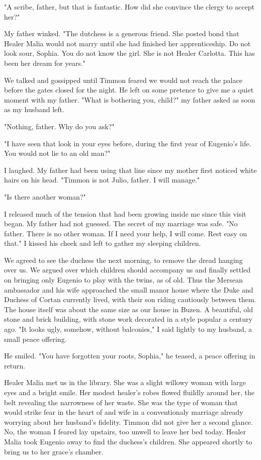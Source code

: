\documentclass{article}
\begin{document}
"A scribe, father, but that is fantastic. How did she convince the clergy to accept her?"

My father winked. "The dutchess is a generous friend. She posted bond that Healer Malia would not marry until she had finished her apprenticeship. Do not look sour, Sophia. You do not know the girl. She is not Healer Carlotta. This has been her dream for years."

We talked and gossipped until Timmon feared we would not reach the palace before the gates closed for the night. He left on some pretence to give me a quiet moment with my father. "What is bothering you, child?" my father asked as soon as my husband left.

"Nothing, father. Why do you ask?"

"I have seen that look in your eyes before, during the first year of Eugenio's life. You would not lie to an old man?"

I laughed. My father had been using that line since my mother first noticed white hairs on his head. "Timmon is not Julio, father. I will manage."

"Is there another woman?"

I released much of the tension that had been growing inside me since this visit began. My father had not guessed. The secret of my marriage was safe. "No father. There is no other woman. If I need your help, I will come. Rest easy on that." I kissed his cheek and left to gather my sleeping children.

\vspace{.5cm}

We agreed to see the duchess the next morning, to remove the dread hanging over us. We argued over which children should accompany us and finally settled on bringing only Eugenio to play with the twins, as of old. Thus the Mersean ambassador and his wife approached the small manor house where the Duke and Duchess of Cortan currently lived, with their son riding cautiously between them. The house itself was about the same size as our house in Buzen. A beautiful, old stone and brick building, with stone work decorated in a style popular a century ago. "It looks ugly, somehow, without balconies," I said lightly to my husband, a small peace offering.

He smiled. "You have forgotten your roots, Sophia," he teased, a peace offering in return.

Healer Malia met us in the library. She was a slight willowy woman with large eyes and a bright smile. Her modest healer's robes flowed fluildly around her, the belt revealing the narrowness of her waste. She was the type of woman that would strike fear in the heart of and wife in a conventionaly marriage already worrying about her husband's fidelity. Timmon did not give her a second glance. No, the woman I feared lay upstairs, too unwell to leave her bed today. Healer Malia took Eugenio away to find the duchess's children. She appeared shortly to bring us to her grace's chamber.
\end{document}
